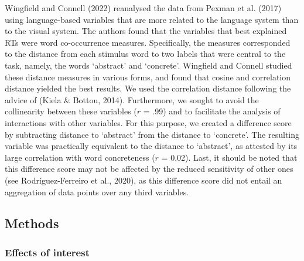 \documentclass[
  12pt,
  man,floatsintext]{apa7}
\begin{document}
Wingfield and Connell (2022) reanalysed the data from Pexman et al. (2017) using language-based variables that are more related to the language system than to the visual system. The authors found that the variables that best explained RTs were word co-occurrence measures. Specifically, the measures corresponded to the distance from each stimulus word to two labels that were central to the task, namely, the words `abstract' and `concrete'. Wingfield and Connell studied these distance measures in various forms, and found that cosine and correlation distance yielded the best results. We used the correlation distance following the advice of (Kiela \& Bottou, 2014). Furthermore, we sought to avoid the collinearity between these variables (\(r\) = .99) and to facilitate the analysis of interactions with other variables. For this purpose, we created a difference score by subtracting distance to `abstract' from the distance to `concrete'. The resulting variable was practically equivalent to the distance to `abstract', as attested by its large correlation with word concreteness (\(r\) = 0.02). Last, it should be noted that this difference score may not be affected by the reduced sensitivity of other ones (see Rodríguez-Ferreiro et al., 2020), as this difference score did not entail an aggregation of data points over any third variables.

\hypertarget{methods-2}{%
\subsection{Methods}\label{methods-2}}

\hypertarget{effects-of-interest-1}{%
\subsubsection{Effects of interest}\label{effects-of-interest-1}}
\end{document}
